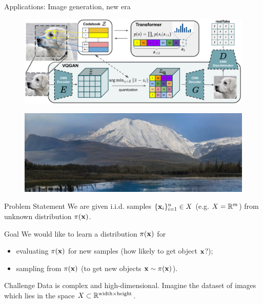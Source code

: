\begin{frame}{Applications: Image generation, new era}
	\begin{figure}
		\includegraphics[width=0.8\linewidth]{figs/taming_transformers_1}
	\end{figure}
	\begin{figure}
		\includegraphics[width=\linewidth]{figs/taming_transformers_2}
	\end{figure}
\end{frame}
\begin{frame}{Problem Statement}
We are given i.i.d. samples $\{\mathbf{x}_i\}_{i=1}^n \in X$ (e.g. $X = \mathbb{R}^m$) from unknown distribution $\pi(\mathbf{x})$.

\begin{block}{Goal}
	We would like to learn a distribution $\pi(\mathbf{x})$ for 
	\begin{itemize}
	    \item evaluating $\pi(\mathbf{x})$ for new samples (how likely to get object $\mathbf{x}$?);
	    \item sampling from $\pi(\mathbf{x})$ (to get new objects $\mathbf{x} \sim \pi(\mathbf{x})$).
	\end{itemize}
\end{block}
\begin{block}{Challenge}
	 Data is complex and high-dimensional. Imagine the dataset of images which lies in the space $X \subset \mathbb{R}^{\text{width} \times \text{height}}$.
\end{block}
\end{frame}
